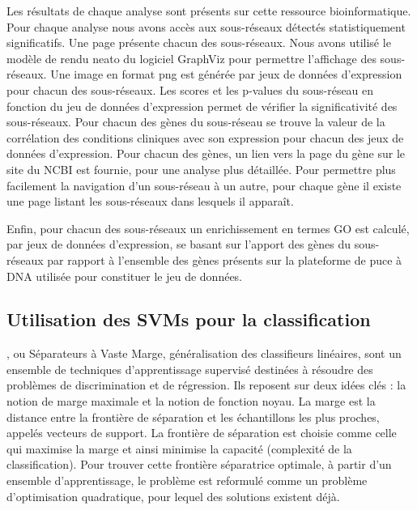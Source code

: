 			Les résultats de chaque analyse sont présents sur cette ressource bioinformatique.
			Pour chaque analyse nous avons accès aux sous-réseaux détectés statistiquement significatifs.
			Une page présente chacun des sous-réseaux.
			Nous avons utilisé le modèle de rendu neato du logiciel GraphViz pour permettre l'affichage des sous-réseaux.
			Une image en format png est générée par jeux de données d'expression pour chacun des sous-réseaux.
			Les scores et les p-values du sous-réseau en fonction du jeu de données d'expression permet de vérifier la significativité des sous-réseaux.
			Pour chacun des gènes du sous-réseau se trouve la valeur de la corrélation des conditions cliniques avec son expression pour chacun des jeux de données d'expression.
			Pour chacun des gènes, un lien vers la page du gène sur le site du NCBI est fournie, pour une analyse plus détaillée.
			Pour permettre plus facilement la navigation d'un sous-réseau à un autre, pour chaque gène il existe une page listant les sous-réseaux dans lesquels il apparaît.

\pagebreak

			Enfin, pour chacun des sous-réseaux un enrichissement en termes \acs{GO} est calculé, par jeux de données d'expression, se basant sur l'apport des gènes du sous-réseaux par rapport à l'ensemble des gènes présents sur la plateforme de puce à \acs{DNA} utilisée pour constituer le jeu de données.

		\subsection{\textcolor{green!45!black}{Utilisation des SVMs pour la classification}}\label{sub:classification}

			, ou Séparateurs à Vaste Marge, généralisation des classifieurs linéaires, sont un ensemble de techniques d'apprentissage supervisé destinées à résoudre des problèmes de discrimination et de régression.
			Ils reposent sur deux idées clés : la notion de marge maximale et la notion de fonction noyau.
			La marge est la distance entre la frontière de séparation et les échantillons les plus proches, appelés vecteurs de support.
			La frontière de séparation est choisie comme celle qui maximise la marge et ainsi minimise la capacité (complexité de la classification).
			Pour trouver cette frontière séparatrice optimale, à partir d'un ensemble d'apprentissage, le problème est reformulé comme un problème d'optimisation quadratique, pour lequel des solutions existent déjà.

